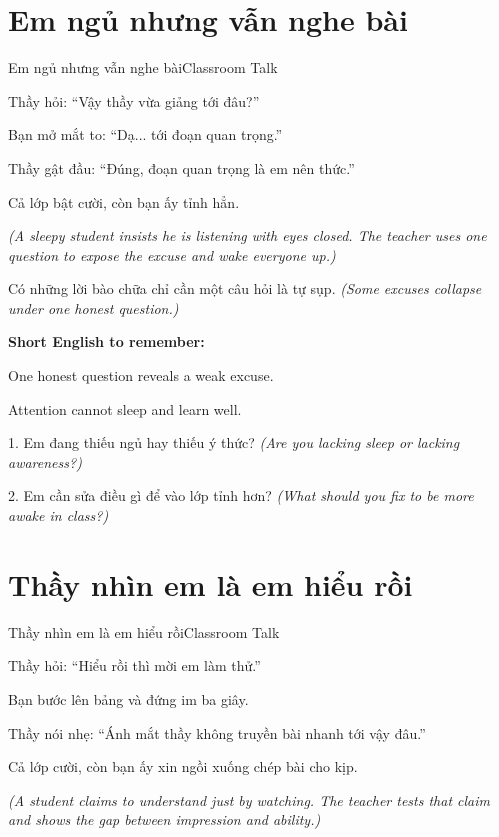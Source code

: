 \section{Em ngủ nhưng vẫn nghe bài}
\begin{truyen}{Em ngủ nhưng vẫn nghe bài}{Classroom Talk}

Thầy hỏi: ``Vậy thầy vừa giảng tới đâu?''

Bạn mở mắt to: ``Dạ... tới đoạn quan trọng.''

Thầy gật đầu: ``Đúng, đoạn quan trọng là em nên thức.''

Cả lớp bật cười, còn bạn ấy tỉnh hẳn.

\textit{(A sleepy student insists he is listening with eyes closed. The teacher uses one question to expose the excuse and wake everyone up.)}
\end{truyen}

\begin{baihoc}
Có những lời bào chữa chỉ cần một câu hỏi là tự sụp.
\textit{(Some excuses collapse under one honest question.)}
\end{baihoc}

\begin{ghinhoanh}
\textbf{Short English to remember:}

One honest question reveals a weak excuse.

Attention cannot sleep and learn well.
\end{ghinhoanh}

\begin{tuhocnhanh}
1. Em đang thiếu ngủ hay thiếu ý thức? \textit{(Are you lacking sleep or lacking awareness?)}

2. Em cần sửa điều gì để vào lớp tỉnh hơn? \textit{(What should you fix to be more awake in class?)}
\end{tuhocnhanh}
\ngancach

\section{Thầy nhìn em là em hiểu rồi}
\begin{truyen}{Thầy nhìn em là em hiểu rồi}{Classroom Talk}

Thầy hỏi: ``Hiểu rồi thì mời em làm thử.''

Bạn bước lên bảng và đứng im ba giây.

Thầy nói nhẹ: ``Ánh mắt thầy không truyền bài nhanh tới vậy đâu.''

Cả lớp cười, còn bạn ấy xin ngồi xuống chép bài cho kịp.

\textit{(A student claims to understand just by watching. The teacher tests that claim and shows the gap between impression and ability.)}
\end{truyen}

